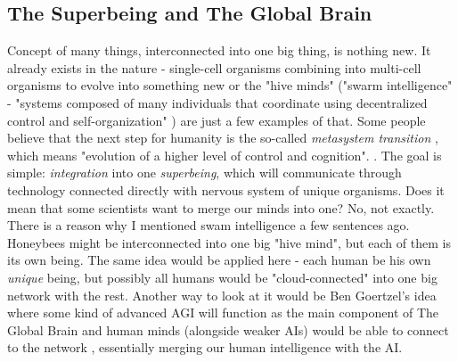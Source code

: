 \documentclass[12pt]{article}
\begin{document}
\subsection{The Superbeing and The Global Brain}
	Concept of many things, interconnected into one big thing, is nothing new. It already exists in the nature - single-cell organisms combining into multi-cell organisms to evolve into something new or the "hive minds" ("swarm intelligence" -  "systems composed of many individuals that coordinate using decentralized control and self-organization" \cite{swarm}) are just a few examples of that. Some people believe that the next step for humanity is the so-called \emph{metasystem transition} \cite{turchin:1}, which means "evolution of a higher level of control and cognition". \cite{heylighen:1}. The goal is simple: \emph{integration} into one \emph{superbeing}, which will communicate through technology connected directly with nervous system of unique organisms. Does it mean that some scientists want to merge our minds into one? No, not exactly. There is a reason why I mentioned swam intelligence a few sentences ago. Honeybees might be interconnected into one big "hive mind", but each of them is its own being. The same idea would be applied here - each human be his own \emph{unique} being, but possibly all humans would be "cloud-connected" into one big network with the rest. Another way to look at it would be Ben Goertzel's idea where some kind of advanced AGI will function as the main component of The Global Brain and human minds (alongside weaker AIs) would be able to connect to the network \cite{globalbrain:1}, essentially merging our human intelligence with the AI.
\end{document}
